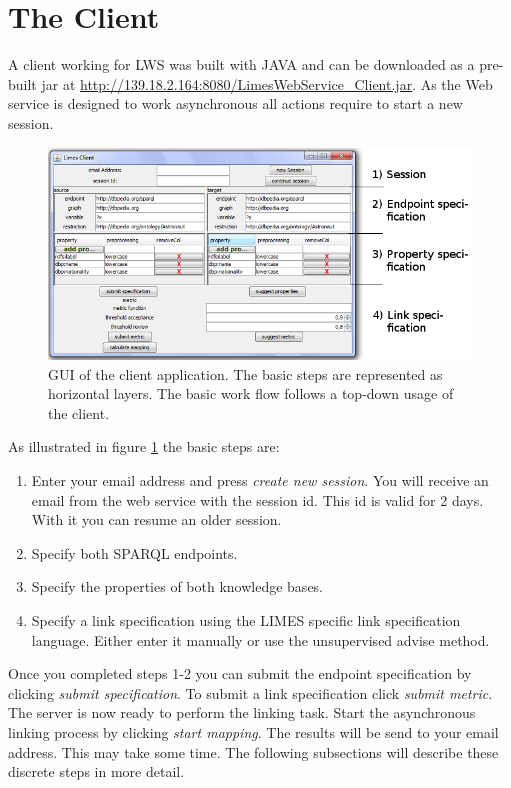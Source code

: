 \documentclass{article}
\begin{document}
\section{The Client}
A client working for LWS was built with JAVA and can be downloaded as a pre-built jar at \url{http://139.18.2.164:8080/LimesWebService_Client.jar}. As the Web service is designed to work asynchronous all actions require to start a new session.\\
\begin{figure}[h]
	\centering
		\includegraphics[width=7in]{images/Client_tasks.png}
	\caption{GUI of the client application. The basic steps are represented as horizontal layers. The basic work flow follows a top-down usage of the client.}
	\label{fig:client_tasks}
\end{figure}
As illustrated in figure \ref{fig:client_tasks} the basic steps are:
\begin{enumerate}
	\item Enter your email address and press \textit{create new session}. You will receive an email from the web service with the session id. This id is valid for 2 days. With it you can resume an older session.
	\item Specify both SPARQL endpoints.
	\item Specify the properties of both knowledge bases. 
	\item Specify a link specification using the LIMES specific link specification language. Either enter it manually or use the unsupervised advise method.
\end{enumerate}
Once you completed steps 1-2 you can submit the endpoint specification by clicking \textit{submit specification}. To submit a link specification click \textit{submit metric}. The server is now ready to perform the linking task. Start the asynchronous linking process by clicking \textit{start mapping}. The results will be send to your email address. This may take some time.
The following subsections will describe these discrete steps in more detail.
\end{document}
